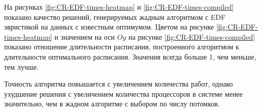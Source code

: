 На рисунках \ref{fig:CR-EDF-times-heatmap} и \ref{fig:CR-EDF-times-compiled} показано качество решений, генерируемых жадным алгоритмом с EDF эвристикой на данных с известным оптимумом. Цветом на рисунке \ref{fig:CR-EDF-times-heatmap} и значением на оси $Oy$ на рисунке \ref{fig:CR-EDF-times-compiled} показано отношение длительности расписания, построенного алгоритмом к длительности оптимального расписания. Значения всегда больше 1, чем меньше, тем лучше.

Точность алгоритма повышается с увеличением количества работ, однако ухудшение решения с увеличением количества процессоров в системе менее значительно, чем в жадном алгоритме с выбором по числу потомков. 


